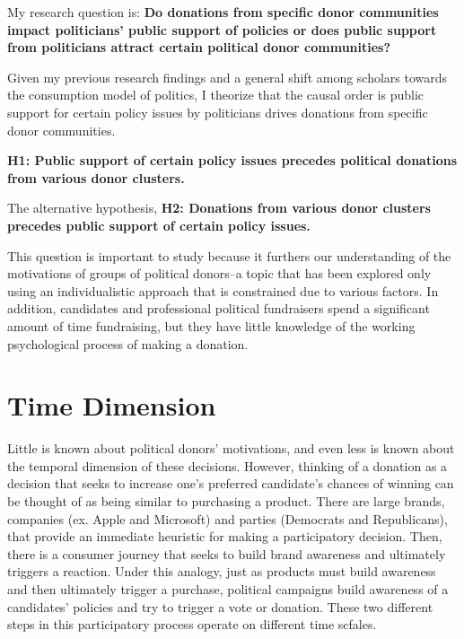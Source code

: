 \documentclass[12pt,]{article}
\begin{document}
My research question is: \textbf{Do donations from specific donor
communities impact politicians' public support of policies or does
public support from politicians attract certain political donor
communities?}

Given my previous research findings and a general shift among scholars
towards the consumption model of politics, I theorize that the causal
order is public support for certain policy issues by politicians drives
donations from specific donor communities.

\textbf{H1: Public support of certain policy issues precedes political
donations from various donor clusters.}

The alternative hypothesis, \textbf{H2: Donations from various donor
clusters precedes public support of certain policy issues.}

This question is important to study because it furthers our
understanding of the motivations of groups of political donors--a topic
that has been explored only using an individualistic approach that is
constrained due to various factors. In addition, candidates and
professional political fundraisers spend a significant amount of time
fundraising, but they have little knowledge of the working psychological
process of making a donation.

\hypertarget{time-dimension}{%
\section{Time Dimension}\label{time-dimension}}

Little is known about political donors' motivations, and even less is
known about the temporal dimension of these decisions. However, thinking
of a donation as a decision that seeks to increase one's preferred
candidate's chances of winning can be thought of as being similar to
purchasing a product. There are large brands, companies (ex. Apple and
Microsoft) and parties (Democrats and Republicans), that provide an
immediate heuristic for making a participatory decision. Then, there is
a consumer journey that seeks to build brand awareness and ultimately
triggers a reaction. Under this analogy, just as products must build
awareness and then ultimately trigger a purchase, political campaigns
build awareness of a candidates' policies and try to trigger a vote or
donation. These two different steps in this participatory process
operate on different time scfales.
\end{document}
